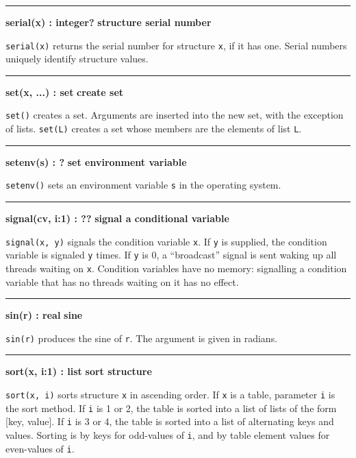 \bigskip\hrule\vspace{0.1cm}
\noindent
{\bf serial(x) : integer? } \hfill {\bf structure serial number}

\noindent
{}\texttt{serial(x)} returns the serial number for
structure \texttt{x}, if it has one. Serial numbers uniquely identify
structure values.

\bigskip\hrule\vspace{0.1cm}
\noindent
{\bf set(x, ...) : set } \hfill {\bf create set}

\noindent
{}\texttt{set()} creates a set. Arguments
are inserted into the new set, with the exception of lists.
\texttt{set(L)} creates a set whose members are the elements of list
\texttt{L}.

\bigskip\hrule\vspace{0.1cm}
\noindent
{\bf setenv(s) : ? } \hfill {\bf set environment variable}

\noindent
{}\texttt{setenv()} sets an environment variable
\texttt{s} in the operating system.

\bigskip\hrule\vspace{0.1cm}
\noindent
{\bf signal(cv, i:1) : ?? } \hfill {\bf signal a conditional variable}

\noindent
{}\texttt{signal(x, y)} signals the condition variable
\texttt{x}. If \texttt{y} is supplied, the condition variable is
signaled \texttt{y} times. If \texttt{y} is 0, a ``broadcast''
signal is sent waking up all threads waiting on \texttt{x}.
Condition variables have no memory: signalling a condition variable
that has no threads waiting on it has no effect.

\bigskip\hrule\vspace{0.1cm}
\noindent
{\bf sin(r) : real } \hfill {\bf sine}

\noindent
{}\texttt{sin(r)} produces the sine of
\texttt{r}. The argument is given in radians.

\bigskip\hrule\vspace{0.1cm}
\noindent
{\bf sort(x, i:1) : list } \hfill {\bf sort structure}

\noindent
{}\texttt{sort(x, i)} sorts structure \texttt{x} in
ascending order. If
\texttt{x} is a table, parameter \texttt{i} is the sort method. If
\texttt{i} is 1 or 2, the table is sorted into a list of lists of the
form [key, value]. If \texttt{i} is 3 or 4, the table is sorted into a
list of alternating keys and values. Sorting is by keys for odd-values
of \texttt{i}, and by table element values for even-values of
\texttt{i}.

